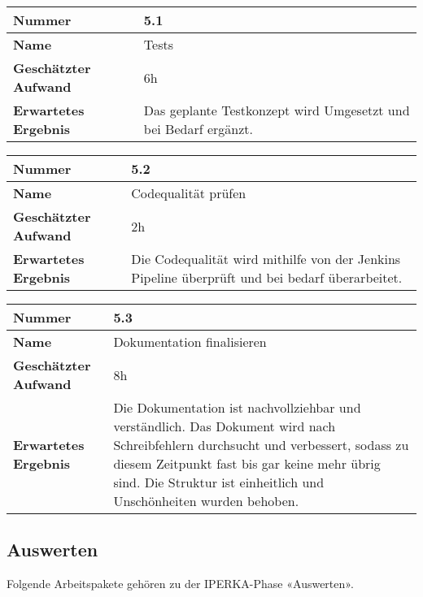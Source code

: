 \begin{longtable}{p{}|p{}}
	\hline
	\textbf{Nummer}                 & \textbf{5.1}            \\
	\hline
	\textbf{Name}   				& Tests                  \\
	\hline
	\textbf{Geschätzter Aufwand}    & 6h                                    \\
	\hline
	\textbf{Erwartetes Ergebnis}    & Das geplante Testkonzept wird Umgesetzt und bei Bedarf ergänzt.                                    \\
	\hline
\end{longtable}\label{tab:kontrollieren-5.1}

\begin{longtable}{p{}|p{}}
	\hline
	\textbf{Nummer}                 & \textbf{5.2}            \\
	\hline
	\textbf{Name}   				& Codequalität prüfen                  \\
	\hline
	\textbf{Geschätzter Aufwand}    & 2h                                    \\
	\hline
	\textbf{Erwartetes Ergebnis}    & Die Codequalität wird mithilfe von der Jenkins Pipeline überprüft und bei bedarf überarbeitet.                                    \\
	\hline
\end{longtable}\label{tab:kontrollieren-5.2}

\begin{longtable}{p{}|p{}}
	\hline
	\textbf{Nummer}                 & \textbf{5.3}            \\
	\hline
	\textbf{Name}   				& Dokumentation finalisieren                  \\
	\hline
	\textbf{Geschätzter Aufwand}    & 8h                                    \\
	\hline
	\textbf{Erwartetes Ergebnis}    & Die Dokumentation ist nachvollziehbar und verständlich. Das Dokument wird nach Schreibfehlern durchsucht und verbessert, sodass zu diesem Zeitpunkt fast bis gar keine mehr übrig sind. Die Struktur ist einheitlich und Unschönheiten wurden behoben.                                    \\
	\hline
\end{longtable}\label{tab:kontrollieren-5.3}

\subsection{Auswerten}
Folgende Arbeitspakete gehören zu der IPERKA-Phase «Auswerten».

